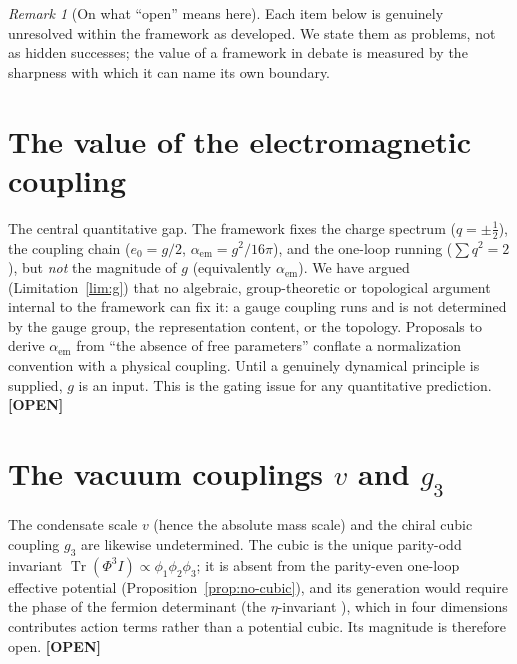 \documentclass[11pt,oneside]{book}
\newcommand{\Tr}{\operatorname{Tr}}
\newcommand{\status}[1]{{\sffamily\bfseries\color{statuscol}[#1]}}
\theoremstyle{plain}
\theoremstyle{definition}
\theoremstyle{remark}
\newtheorem{remark}[theorem]{Remark}
\begin{document}
\begin{remark}[On what ``open'' means here]
Each item below is genuinely unresolved within the framework as developed. We state
them as problems, not as hidden successes; the value of a framework in debate is
measured by the sharpness with which it can name its own boundary.
\end{remark}

\section{The value of the electromagnetic coupling}
\label{op:g}

The central quantitative gap. The framework fixes the charge spectrum
($q=\pm\tfrac12$), the coupling chain ($e_0=g/2$, $\alpha_{\mathrm{em}}=g^2/16\pi$),
and the one-loop running ($\sum q^2=2$), but \emph{not} the magnitude of $g$
(equivalently $\alpha_{\mathrm{em}}$). We have argued (Limitation~\ref{lim:g}) that
no algebraic, group-theoretic or topological argument internal to the framework can
fix it: a gauge coupling runs and is not determined by the gauge group, the
representation content, or the topology. Proposals to derive $\alpha_{\mathrm{em}}$
from ``the absence of free parameters'' conflate a normalization convention with a
physical coupling. Until a genuinely dynamical principle is supplied, $g$ is an
input. This is the gating issue for any quantitative prediction. \status{OPEN}

\section{The vacuum couplings $v$ and $g_3$}
\label{sec:open-vacuum}

The condensate scale $v$ (hence the absolute mass scale) and the chiral cubic
coupling $g_3$ are likewise undetermined. The cubic is the unique parity-odd
invariant $\Tr(\Phi^3 I)\propto\phi_1\phi_2\phi_3$; it is absent from the parity-even
one-loop effective potential (Proposition~\ref{prop:no-cubic}), and its generation
would require the phase of the fermion determinant (the $\eta$-invariant
\cite{AtiyahPatodiSinger1975}), which in four dimensions contributes action terms
rather than a potential cubic. Its magnitude is therefore open. \status{OPEN}

\end{document}
